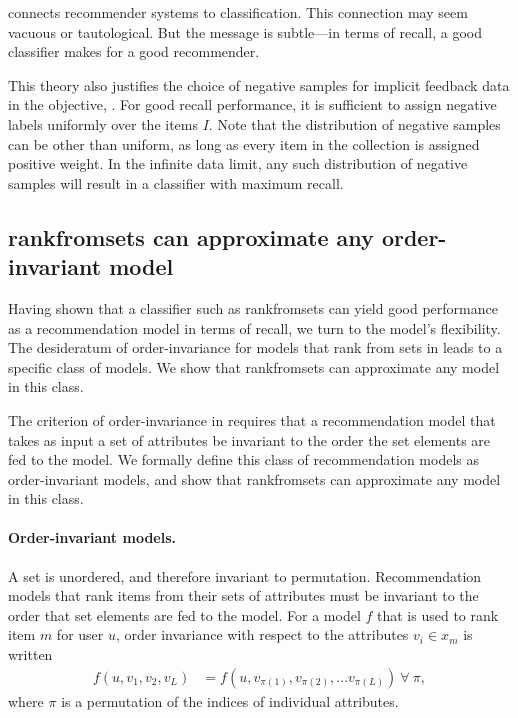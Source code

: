  connects recommender systems to classification. This connection may
seem vacuous or tautological. But the message is subtle---in terms of recall, a
good classifier makes for a good recommender.

This theory also justifies the choice of negative samples for implicit feedback
data in the objective, . For good recall performance, it is
sufficient to assign negative labels uniformly over the items $I$. Note that the
distribution of negative samples can be other than uniform, as long as every
item in the collection is assigned positive weight. In the infinite data limit,
any such distribution of negative samples will result in a classifier with
maximum recall.

\subsection{\acrshort{rankfromsets} can approximate any order-invariant model}

Having shown that a classifier such as \acrshort{rankfromsets} can yield good
performance as a recommendation model in terms of recall, we turn to the model's
flexibility. The desideratum of order-invariance for models that rank from sets
in  leads to a specific class of models. We show that
\acrshort{rankfromsets} can approximate any model in this class.

The criterion of order-invariance in  requires that a
recommendation model that takes as input a set of attributes be invariant to the
order the set elements are fed to the model. We formally define this class of
recommendation models as order-invariant models, and show that
\acrshort{rankfromsets} can approximate any model in this class.

\paragraph{Order-invariant models.} A set is unordered, and therefore invariant
to permutation. Recommendation models that rank items from their sets of
attributes must be invariant to the order that set elements are fed to the
model. For a model $f$ that is used to rank item $m$ for user $u$, order
invariance with respect to the attributes $v_i \in x_m$ is written
\begin{align}
  f(u, {v_1, v_2, v_L}) &= f(u, {v_{\pi(1)}, v_{\pi(2)}, \ldots
                                     v_{\pi(L)}})~\forall~\pi,
\label{eq:order-invariance}                                     
\end{align}
where $\pi$ is a permutation of the indices of individual attributes.

